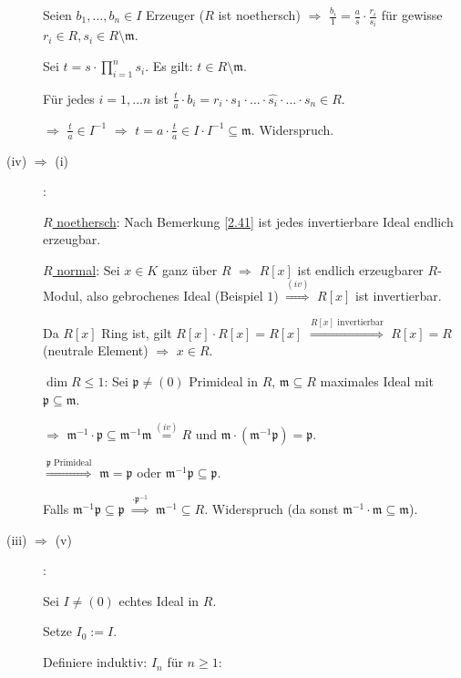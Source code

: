 \documentclass[a4paper, 10pt]{report}
\begin{document}
\begin{Bew}
\begin{description}
Seien $b_1, \ldots, b_n \in I$ Erzeuger ($R$ ist noethersch) $\Rightarrow$
$\frac{b_i}{1} = \frac{a}{s} \cdot \frac{r_i}{s_i}$ f\"ur gewisse $r_i \in R,
s_i \in R \setminus \mathfrak{m}$.

Sei $t = s \cdot \prod_{i=1}^{n} s_i$. Es gilt: $t \in R \setminus \mathfrak{m}$.

F\"ur jedes $i = 1, \ldots n$ ist $\frac{t}{a} \cdot b_i = r_i \cdot s_1 \cdot \ldots \cdot \widehat{s_i} \cdot \ldots \cdot s_n \in R$.

$\Rightarrow$ $\frac{t}{a} \in I^{-1}$ $\Rightarrow$ $t = a \cdot \frac{t}{a} \in I \cdot I^{-1} \subseteq \mathfrak{m}$. Widerspruch.

\item[(iv) $\Rightarrow$ (i)]:

\underline{$R$ noethersch}: Nach Bemerkung \ref{2.41} ist jedes invertierbare Ideal endlich erzeugbar.

\underline{$R$ normal}: Sei $x \in K$ ganz \"uber $R$ $\Rightarrow$ $R[x]$ ist
endlich erzeugbarer $R$-Modul, also gebrochenes Ideal (Beispiel $1$) $\overset{(iv)}{\Rightarrow}$ $R[x]$ ist invertierbar. 

Da $R[x]$ Ring ist, gilt $R[x] \cdot R[x] = R[x]$ $\overset{R[x]\text{ invertierbar}}{\Rightarrow}$ $R[x] = R$ (neutrale Element)
$\Rightarrow$ $x \in R$.

\underline{$\dim R \leq 1$}: Sei $\mathfrak{p} \neq (0)$ Primideal in $R$, $\mathfrak{m} \subseteq R$ maximales Ideal mit $\mathfrak{p} \subseteq \mathfrak{m}$.

$\Rightarrow$ $\mathfrak{m}^{-1} \cdot \mathfrak{p} \subseteq \mathfrak{m}^{-1} \mathfrak{m} \overset{(iv)}{=} R$ und $\mathfrak{m} \cdot (\mathfrak{m}^{-1} \mathfrak{p}) = \mathfrak{p}$.

$\overset{\mathfrak{p}\text{ Primideal}}{\Rightarrow}$ $\mathfrak{m} = \mathfrak{p}$ oder $\mathfrak{m}^{-1} \mathfrak{p} \subseteq \mathfrak{p}$.

Falls $\mathfrak{m}^{-1} \mathfrak{p} \subseteq \mathfrak{p}$ $\overset{\cdot \mathfrak{p}^{-1}}{\Rightarrow}$ $\mathfrak{m}^{-1} \subseteq R$. Widerspruch (da sonst $\mathfrak{m}^{-1} \cdot \mathfrak{m} \subseteq \mathfrak{m}$).

\item[(iii) $\Rightarrow$ (v)]:

Sei $I \neq (0)$ echtes Ideal in $R$.

Setze $I_0 := I$.

Definiere induktiv: $I_n$ f\"ur $n \geq 1$:


\end{description}
\end{Bew}
\end{document}
